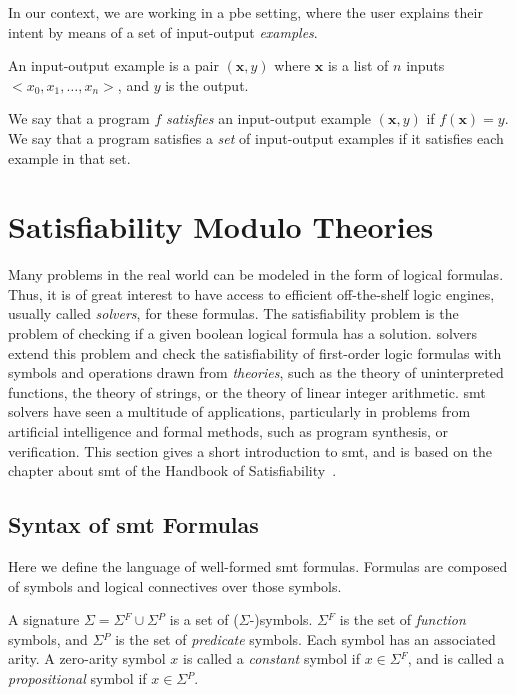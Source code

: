 In our context, we are working in a \gls{pbe} setting, where the user explains
their intent by means of a set of input-output \textit{examples}.

\begin{definition}
  An input-output example is a pair $(\mathbf{x}, y)$ where $\mathbf{x}$ is a
  list of $n$ inputs $<x_0, x_1, \ldots, x_n>$, and $y$ is the output.
\end{definition}

We say that a program $f$ \textit{satisfies} an input-output example
$(\mathbf{x}, y)$ if $f(\mathbf{x}) = y$.
We say that a program satisfies a \textit{set} of input-output examples if it
satisfies each example in that set.

\section{Satisfiability Modulo Theories}
\label{sec:smt}

Many problems in the real world can be modeled in the form of logical formulas.
Thus, it is of great interest to have access to efficient off-the-shelf
logic engines, usually called \textit{solvers}, for these formulas.
The satisfiability problem is the problem of checking if a given boolean logical
formula has a solution.
 solvers extend this problem and check the satisfiability of
first-order logic formulas with symbols and operations drawn from
\textit{theories}, such as the theory of uninterpreted functions, the theory of
strings, or the theory of linear integer arithmetic.
\gls{smt} solvers have seen a multitude of applications, particularly in
problems from artificial intelligence and formal methods, such as program
synthesis, or verification.
This section gives a short introduction to \gls{smt}, and is based on the
chapter about \gls{smt} of the Handbook of Satisfiability~\cite{Biere:2009:HSV}.

\subsection{Syntax of \gls{smt} Formulas}
\label{sec:smt-syntax}

Here we define the language of well-formed \gls{smt} formulas. Formulas are
composed of symbols and logical connectives over those symbols.

\begin{definition}[Signature]
  A signature $\Sigma{} = \Sigma{}^F \cup{} \Sigma{}^P$ is a set of
  ($\Sigma{}$-)symbols.
  $\Sigma{}^F$ is the set of \textit{function} symbols, and $\Sigma{}^P$ is the
  set of \textit{predicate} symbols.
  Each symbol has an associated arity. A zero-arity symbol $x$ is called a
  \textit{constant} symbol if $x \in \Sigma{}^F$, and is called a
  \textit{propositional} symbol if $x \in \Sigma{}^P$.
\end{definition}

